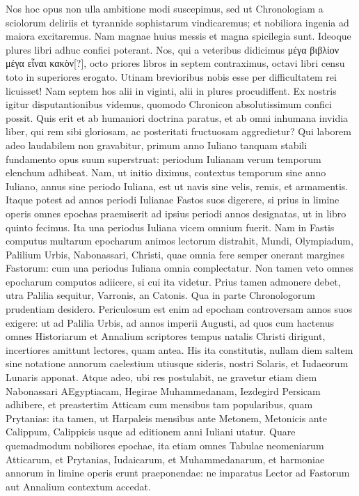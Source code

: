 Nos hoc opus non ulla ambitione
modi suscepimus, sed ut Chronologiam a sciolorum deliriis et tyrannide
sophistarum vindicaremus; et nobiliora ingenia ad maiora excitaremus.
Nam magnae huius messis et magna spicilegia sunt.
Ideoque
plures libri adhuc confici poterant.
Nos, qui a veteribus didicimus
\textgreek{μέγα βιβλίον μέγα εἶναι κακὸν[?]},
 octo priores libros in septem contraximus,
octavi libri censu toto in superiores erogato.
Utinam brevioribus nobis esse per difficultatem rei licuisset!
Nam septem hos alii
in viginti, alii in plures procudiffent.
Ex nostris igitur disputantionibus
videmus, quomodo Chronicon absolutissimum confici possit.
Quis
erit et ab humaniori doctrina paratus, et ab omni inhumana invidia
liber, qui rem sibi gloriosam, ac posteritati fructuosam aggredietur?
Qui laborem adeo laudabilem non gravabitur, primum anno Iuliano
tanquam stabili fundamento opus suum superstruat: periodum Iulianam
verum temporum elenchum adhibeat.
Nam, ut initio diximus,
contextus temporum sine anno Iuliano, annus sine periodo Iuliana,
est ut navis sine velis, remis, et armamentis.
Itaque potest ad
annos periodi Iulianae Fastos suos digerere, si prius in limine operis
omnes epochas praemiserit ad ipsius periodi annos designatas, ut in
libro quinto fecimus.
Ita una periodus Iuliana vicem omnium fuerit.
Nam in Fastis computus multarum epocharum animos lectorum distrahit,
Mundi, Olympiadum, Palilium Urbis, Nabonassari, Christi,
quae omnia fere semper onerant margines Fastorum: cum una periodus
Iuliana omnia complectatur.
Non tamen veto omnes epocharum
computos adiicere, si cui ita videtur.
Prius tamen admonere debet,
utra Palilia sequitur, Varronis, an Catonis.
Qua in parte Chronologorum
prudentiam desidero.
Periculosum est enim ad epocham
controversam annos suos exigere: ut ad Palilia Urbis, ad annos imperii
Augusti, ad quos cum hactenus omnes Historiarum et Annalium
scriptores tempus natalis Christi dirigunt, incertiores amittunt
lectores, quam antea.
His ita constitutis, nullam diem saltem sine
notatione annorum caelestium utiusque sideris, nostri Solaris, et Iudaeorum
Lunaris apponat.
Atque adeo, ubi res postulabit, ne gravetur
etiam diem Nabonassari AEgyptiacam, Hegirae Muhammedanam,
Iezdegird Persicam adhibere, et preastertim Atticam cum mensibus
tam popularibus, quam Prytanias: ita tamen, ut Harpaleis mensibus
ante Metonem, Metonicis ante Calippum, Calippicis usque ad
editionem anni Iuliani utatur.
Quare quemadmodum nobiliores epochae,
ita etiam omnes Tabulae neomeniarum Atticarum, et Prytanias,
Iudaicarum, et Muhammedanarum, et harmoniae annorum
in limine operis erunt praeponendae: ne imparatus Lector ad Fastorum
aut Annalium contextum accedat.

